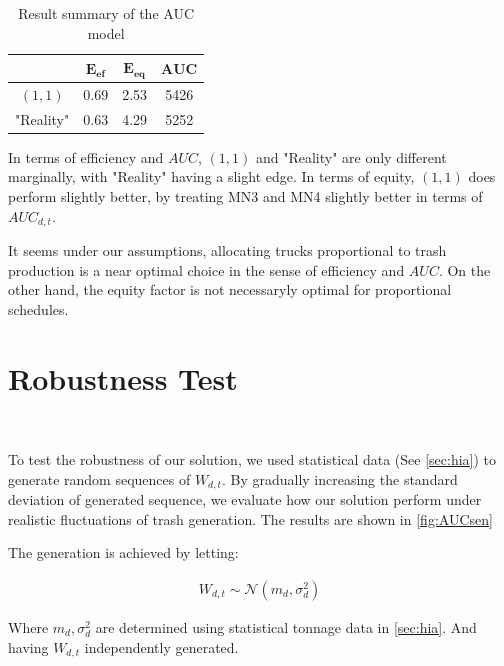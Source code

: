 \documentclass{article}
\begin{document}
\begin{table}[H]
\centering
\begin{tabular}{|c|c|c|c|}
\hline
  & $\mathbf{E_{ef}}$ & $\mathbf{E_{eq}}$ & $\mathbf{AUC}$ \\ \hline
$(1,1)$                  & 0.69    & 2.53     & 5426  \\ \hline
"Reality"                & 0.63     & 4.29    & 5252 \\ \hline
\end{tabular}
\caption{Result summary of the AUC model}
\label{tab:optiandreal}
\end{table}


In terms of efficiency and $AUC$, $(1,1)$ and "Reality" are only different marginally, with "Reality" having a slight edge. In terms of equity, $(1,1)$ does perform slightly better, by treating MN3 and MN4 slightly better in terms of $AUC_{d,t}$.

It seems under our assumptions, allocating trucks proportional to trash production is a near optimal choice in the sense of efficiency and $AUC$. On the other hand, the equity factor is not necessaryly optimal for proportional schedules.

\section {Robustness Test} \ 

\label{sec:senana}
To test the robustness of our solution, we used statistical data (See \cref{sec:hia}) to generate random sequences of $W_{d,t}$. By gradually increasing the standard deviation of generated sequence, we evaluate how our solution perform under realistic fluctuations of trash generation. The results are shown in \cref{fig:AUCsen} 

		The generation is achieved by letting:

		\begin{align}
			W_{d,t} \sim \mathcal{N}(m_d, \sigma_d^2)
		\end{align}

		Where $ m_d, \sigma_d^2$ are determined using statistical tonnage data in \cref{sec:hia}. And having $W_{d,t}$ independently generated.
\end{document}
